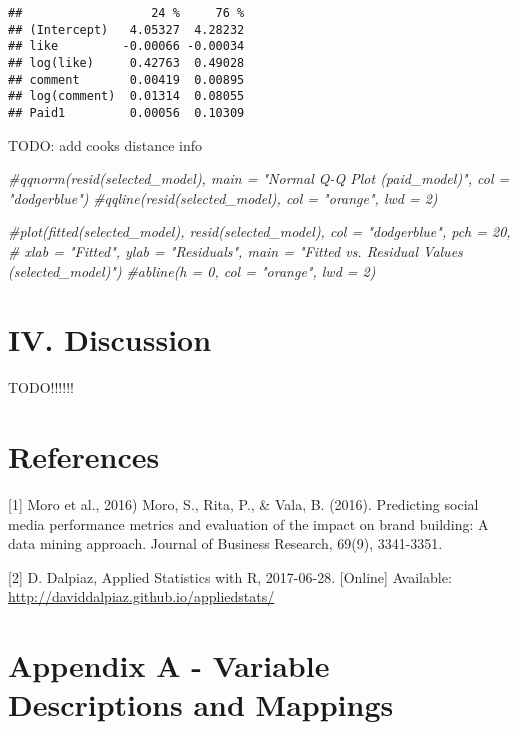 \documentclass[
]{article}
\newenvironment{Shaded}{\begin{snugshade}}{\end{snugshade}}
\newcommand{\CommentTok}[1]{\textcolor[rgb]{0.56,0.35,0.01}{\textit{#1}}}
\begin{document}
\begin{verbatim}
##                  24 %     76 %
## (Intercept)   4.05327  4.28232
## like         -0.00066 -0.00034
## log(like)     0.42763  0.49028
## comment       0.00419  0.00895
## log(comment)  0.01314  0.08055
## Paid1         0.00056  0.10309
\end{verbatim}

TODO: add cooks distance info

\begin{Shaded}
\begin{Highlighting}[]
\CommentTok{#qqnorm(resid(selected_model), main = "Normal Q-Q Plot (paid_model)", col = "dodgerblue")}
\CommentTok{#qqline(resid(selected_model), col = "orange", lwd = 2)}
\end{Highlighting}
\end{Shaded}

\begin{Shaded}
\begin{Highlighting}[]
\CommentTok{#plot(fitted(selected_model), resid(selected_model), col = "dodgerblue", pch = 20,}
\CommentTok{#            xlab = "Fitted", ylab = "Residuals", main = "Fitted vs. Residual Values (selected_model)")}
\CommentTok{#abline(h = 0, col = "orange", lwd = 2)}
\end{Highlighting}
\end{Shaded}

\hypertarget{iv.-discussion}{%
\section{\texorpdfstring{\textbf{IV}.
Discussion}{IV. Discussion}}\label{iv.-discussion}}

TODO!!!!!!

\hypertarget{references}{%
\section{References}\label{references}}

{[}1{]} Moro et al., 2016) Moro, S., Rita, P., \& Vala, B. (2016).
Predicting social media performance metrics and evaluation of the impact
on brand building: A data mining approach. Journal of Business Research,
69(9), 3341-3351.

{[}2{]} D. Dalpiaz, Applied Statistics with R, 2017-06-28. {[}Online{]}
Available: \url{http://daviddalpiaz.github.io/appliedstats/}

\hypertarget{appendix-a---variable-descriptions-and-mappings}{%
\section{Appendix A - Variable Descriptions and
Mappings}\label{appendix-a---variable-descriptions-and-mappings}}
\end{document}
